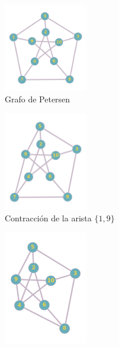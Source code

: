 \documentclass[a4paper,1pt]{report}
\begin{document}
\begin{figure}[H]
    \centering
    \begin{subfigure}[b]{0.45\textwidth}
    \centering
    \includegraphics[width=0.4\textwidth]{figures5/Petersenk51.png}
    \caption{Grafo de Petersen}
    \end{subfigure}
    \begin{subfigure}[b]{0.45\textwidth}
        \centering
        \includegraphics[width=0.4\textwidth]{figures5/Petersenk52.png}
        \caption{Contracción de la arista $\{1,9\}$}
    \end{subfigure}
    \begin{subfigure}[b]{0.45\textwidth}
        \centering
        \includegraphics[width=0.4\textwidth]{figures5/Petersenk53.png}

\end{subfigure}
\end{figure}
\end{document}
